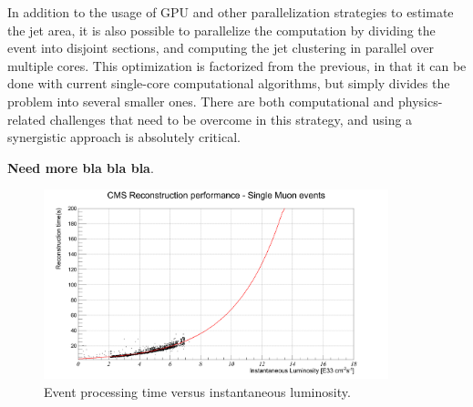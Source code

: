\documentclass[12pt]{article}
\begin{document}
In addition to the usage of GPU and other parallelization strategies
to estimate the jet area, it is also possible to parallelize the
computation by dividing the event into disjoint sections, and
computing the jet clustering in parallel over multiple cores. This
optimization is factorized from the previous, in that it can be done
with current single-core computational algorithms, but simply divides
the problem into several smaller ones. There are both computational
and physics-related challenges that need to be overcome in this
strategy, and using a synergistic approach is absolutely critical. 

\bigskip

{\bf Need more bla bla bla}. 



\begin{figure}[h!]
    \centering
    \includegraphics[width=100mm]{lumitpeSingleMu-fitted2.png}
    \caption{\label{lumitpeSingleMu} Event processing time versus
      instantaneous luminosity.}
\end{figure}


{}
%
\end{document}
